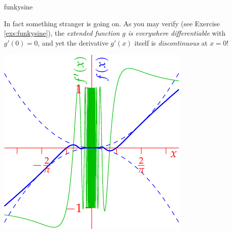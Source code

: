\begin{examples}{}{funkysine}
\begin{enumerate}
\begin{minipage}[t]{0.6\linewidth}
			In fact something stranger is going on. As you may verify (see Exercise \ref{exs:funkysine}), the \emph{extended function $g$ is everywhere differentiable} with $g'(0)=0$, and yet the derivative $g'(x)$ itself is \emph{discontinuous} at $x=0$!
		\end{minipage}
		\hfill
		\begin{minipage}[t]{0.39\linewidth}\vspace{-5pt}
			\flushright\includegraphics[scale=0.95]{unifcontex1}
		\end{minipage}
	\end{enumerate}
\end{examples}

\clearpage


\goodbreak


